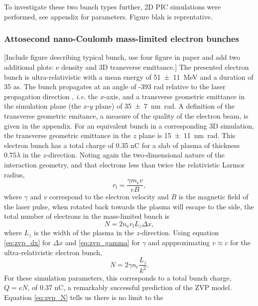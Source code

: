  To investigate these two bunch types further, 2D PIC simulations were performed, see appendix for parameters. Figure blah is reprentative.
 
 \subsubsection{Attosecond nano-Coulomb mass-limited electron bunches}
[Include figure describing typical bunch, use four figure in paper and add two additional plots: e density and 3D transverse emittance.] The presented electron bunch is ultra-relativistic with a mean energy of \qty{51\pm 11}{MeV} and a duration of 35 as. The bunch propagates at an angle of -393 rad relative to the laser propagation direction , \textit{i.e.} the $x$-axis, and a transverse geometric emittance in the simulation plane (the $x$-$y$ plane) of \qty{35 \pm 7}{nm.rad}. A definition of the transverse geometric emitance, a measure of the quality of the electron beam, is given in the appendix. For an equivalent bunch in a corresponding 3D simulation, the transverse geometric emittance in the $z$ plane is \qty{15\pm 11}{nm.rad}. This electron bunch has a total charge of 0.35 nC for a slab of plasma of thickness $0.75\lambda$ in the $z$-direction. Noting again the two-dimensional nature of the interaction geometry, and that electrons less than twice the relativistic Larmor radius, 
\begin{equation}
	r_\mathrm{l} = \frac{\gamma m_\mathrm{e}v}{eB},
\end{equation}
where $\gamma$ and $v$ correspond to the electron velocity and $B$ is the magnetic field of the laser pulse, when rotated back towards the plasma will escape to the side, the total number of electrons in the mass-limited bunch is
\begin{equation}
	N = 2 n_\mathrm{e} r_\mathrm{l} L_z \Delta x,
\end{equation}
where $L_z$ is the width of the plasma in the $z$-direction. Using equation \ref{eq:zvp_dx} for $\Delta x$ and \ref{eq:zvp_gamma} for $\gamma$ and appproximating $v \approx c$ for the ultra-relativistic electron bunch, 
\begin{equation}\label{eq:zvp_N}
	N = 2 \gamma n_\mathrm{c} \frac{L_z}{k^2}.
\end{equation}
For these simulation parameters, this corresponds to a total bunch charge, $Q = eN$, of 0.37 nC, a remarkably successful prediction of the ZVP model. Equation \ref{eq:zvp_N} tells us there is no limit to the 

